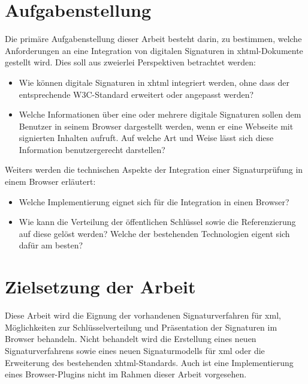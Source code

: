 \section{Aufgabenstellung}
%
\label{sec:einl:aufgabenstellung}%

Die primäre Aufgabenstellung dieser Arbeit besteht darin, zu bestimmen, welche Anforderungen an eine Integration von digitalen Signaturen in \gls{xhtml}-Dokumente gestellt wird. Dies soll aus zweierlei Perspektiven betrachtet werden:
\begin{itemize}
    \item Wie können digitale Signaturen in \gls{xhtml} integriert werden, ohne dass der entsprechende W3C-Standard\cite{xhtml:w3c} erweitert oder angepasst werden?
    \item Welche Informationen über eine oder mehrere digitale Signaturen sollen dem Benutzer in seinem Browser dargestellt werden, wenn er eine Webseite mit signierten Inhalten aufruft. Auf welche Art und Weise lässt sich diese Information benutzergerecht darstellen?
\end{itemize}
Weiters werden die technischen Aspekte der Integration einer Signaturprüfung in einem Browser erläutert:
\begin{itemize}
    \item Welche Implementierung eignet sich für die Integration in einen Browser?
    \item Wie kann die Verteilung der öffentlichen Schlüssel sowie die Referenzierung auf diese gelöst werden? Welche der bestehenden Technologien eigent sich dafür am besten?
\end{itemize}

\section{Zielsetzung der Arbeit}
%
\label{sec:einl:ziele}%
Diese Arbeit wird die Eignung der vorhandenen Signaturverfahren für \gls{xml}, Möglichkeiten zur Schlüsselverteilung und Präsentation der Signaturen im Browser behandeln.
Nicht behandelt wird die Erstellung eines neuen Signaturverfahrens sowie eines neuen Signaturmodells für \gls{xml} oder die Erweiterung des bestehenden \gls{xhtml}-Standards. Auch ist eine Implementierung eines Browser-Plugins nicht im Rahmen dieser Arbeit vorgesehen.

